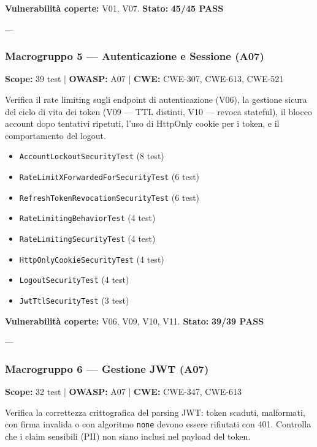\documentclass[12pt, a4paper]{article}
\begin{document}
    \textbf{Vulnerabilità coperte:} V01, V07. \quad
    \textbf{Stato:} \checkmark{} \textbf{45/45 PASS}

    ---

    \subsubsection{Macrogruppo 5 — Autenticazione e Sessione (A07)}
    \label{subsubsec:group5_authentication}

    \textbf{Scope:} 39 test | \textbf{OWASP:} A07 | \textbf{CWE:} CWE-307, CWE-613, CWE-521

    Verifica il rate limiting sugli endpoint di autenticazione (V06), la gestione
    sicura del ciclo di vita dei token (V09 — TTL distinti, V10 — revoca stateful),
    il blocco account dopo tentativi ripetuti, l'uso di HttpOnly cookie per i token,
    e il comportamento del logout.

    \begin{itemize}
        \item \texttt{AccountLockoutSecurityTest} (8 test)
        \item \texttt{RateLimitXForwardedForSecurityTest} (6 test)
        \item \texttt{RefreshTokenRevocationSecurityTest} (6 test)
        \item \texttt{RateLimitingBehaviorTest} (4 test)
        \item \texttt{RateLimitingSecurityTest} (4 test)
        \item \texttt{HttpOnlyCookieSecurityTest} (4 test)
        \item \texttt{LogoutSecurityTest} (4 test)
        \item \texttt{JwtTtlSecurityTest} (3 test)
    \end{itemize}

    \textbf{Vulnerabilità coperte:} V06, V09, V10, V11. \quad
    \textbf{Stato:} \checkmark{} \textbf{39/39 PASS}

    ---

    \subsubsection{Macrogruppo 6 — Gestione JWT (A07)}
    \label{subsubsec:group6_jwt}

    \textbf{Scope:} 32 test | \textbf{OWASP:} A07 | \textbf{CWE:} CWE-347, CWE-613

    Verifica la correttezza crittografica del parsing JWT: token scaduti, malformati,
    con firma invalida o con algoritmo \texttt{none} devono essere rifiutati con 401.
    Controlla che i claim sensibili (PII) non siano inclusi nel payload del token.
\end{document}

